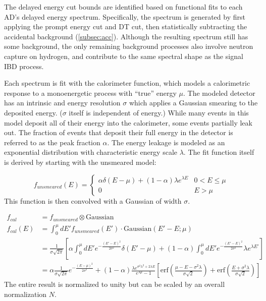 The delayed energy cut bounds are identified based on
functional fits to each AD's delayed energy spectrum.
Specifically, the spectrum is generated by first applying
the prompt energy cut and DT cut,
then statistically subtracting the accidental background (\cref{subsec:acc}).
Although the resulting spectrum still has some background,
the only remaining background processes also involve
neutron capture on hydrogen, and contribute to the same spectral shape
as the signal IBD process.

Each spectrum is fit with the calorimeter function, which models
a calorimetric response to a monoenergetic process with ``true''
energy $\mu$.
The modeled detector has an intrinsic and energy resolution $\sigma$
which applies a Gaussian smearing to the deposited energy.
($\sigma$ itself is independent of energy.)
While many events in this model deposit all of their energy into
the calorimeter, some events partially leak out.
The fraction of events that deposit their full energy in the detector
is referred to as the peak fraction $\alpha$.
The energy leakage is modeled as an exponential distribution
with characteristic energy scale $\lambda$.
The fit function itself is derived by starting with
the unsmeared model:

\begin{equation*}
    f_{unsmeared}(E) =
    \begin{cases}
        \alpha\delta(E-\mu) + (1-\alpha)\lambda e^{\lambda E}
        & 0 < E \leq \mu \\
        0 & E > \mu
    \end{cases}
\end{equation*}
This function is then convolved with a Gaussian
of width $\sigma$.

\begin{align*}
    f_{cal}    &= f_{unsmeared} \otimes \text{Gaussian} \\
    f_{cal}(E) &= \int_0^\mu dE' f_{unsmeared}(E') \cdot \text{Gaussian}(E'-E; \mu) \\
               &= \frac{1}{\sigma\sqrt{2\pi}}
               \left[
                   \alpha\int_0^\mu dE' e^{-\frac{(E'-E)^2}{2\sigma^2}} \delta(E'-\mu)
                   + (1-\alpha)\int_0^\mu dE' e^{-\frac{(E'-E)^2}{2\sigma^2}}
                   \lambda e^{\lambda E'}
               \right] \\
               &= \alpha\frac{1}{\sigma\sqrt{2\pi}}e^{-\frac{(E-\mu)^2}{2\sigma^2}}
               + (1-\alpha)
               \frac{\lambda e^{\sigma^2\lambda^2+2\lambda E}}{e^{\lambda\mu}-1}
               \left[
                   \text{erf}
                   \left(
                       \frac{\mu-E-\sigma^2\lambda}{\sigma\sqrt{2}}
                   \right)
                   + \text{erf}
                   \left(
                       \frac{E + \sigma^2\lambda}{\sigma\sqrt{2}}
                   \right)
               \right]
\end{align*}
The entire result is normalized to unity
but can be scaled by an overall normalization $N$.

